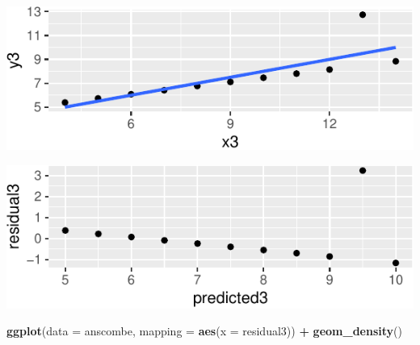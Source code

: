 \documentclass[14pt]{extarticle}
\newenvironment{Shaded}{\begin{snugshade}}{\end{snugshade}}
\newcommand{\KeywordTok}[1]{\textcolor[rgb]{0.13,0.29,0.53}{\textbf{#1}}}
\newcommand{\DataTypeTok}[1]{\textcolor[rgb]{0.13,0.29,0.53}{#1}}
\newcommand{\StringTok}[1]{\textcolor[rgb]{0.31,0.60,0.02}{#1}}
\newcommand{\OperatorTok}[1]{\textcolor[rgb]{0.81,0.36,0.00}{\textbf{#1}}}
\newcommand{\NormalTok}[1]{#1}
\begin{document}
\includegraphics{20181112_anscombe_residuals_files/figure-latex/unnamed-chunk-9-1.pdf}

\begin{Shaded}
\end{Shaded}

\includegraphics{20181112_anscombe_residuals_files/figure-latex/unnamed-chunk-10-1.pdf}

\begin{Shaded}
\begin{Highlighting}[]
\KeywordTok{ggplot}\NormalTok{(}\DataTypeTok{data =}\NormalTok{ anscombe, }\DataTypeTok{mapping =} \KeywordTok{aes}\NormalTok{(}\DataTypeTok{x =}\NormalTok{ residual3)) }\OperatorTok{+}
\StringTok{  }\KeywordTok{geom_density}\NormalTok{()}
\end{Highlighting}
\end{Shaded}
\end{document}
